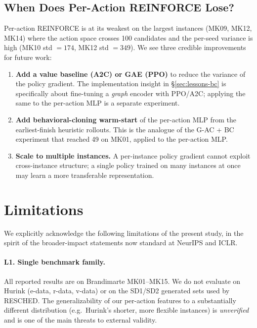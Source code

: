 \documentclass[10pt]{article}
\theoremstyle{definition}
\newcommand{\eg}{e.g.\!}
\begin{document}
\subsection{When Does Per-Action REINFORCE Lose?}

Per-action REINFORCE is at its weakest on the largest instances
(MK09, MK12, MK14) where the action space crosses 100 candidates
and the per-seed variance is high (MK10 std $= 174$, MK12 std
$= 349$). We see three credible improvements for future work:
\begin{enumerate}
  \item \textbf{Add a value baseline (A2C) or GAE (PPO)} to
        reduce the variance of the policy gradient. The
        implementation insight in \S\ref{sec:lessons-bc}
        is specifically about fine-tuning a \emph{graph}
        encoder with PPO/A2C; applying the same to the
        per-action MLP is a separate experiment.
  \item \textbf{Add behavioral-cloning warm-start} of the
        per-action MLP from the earliest-finish heuristic
        rollouts. This is the analogue of the G-AC + BC
        experiment that reached 49 on MK01, applied to the
        per-action MLP.
  \item \textbf{Scale to multiple instances.} A per-instance
        policy gradient cannot exploit cross-instance structure; a
        single policy trained on many instances at once may learn
        a more transferable representation.
\end{enumerate}

\section{Limitations}
\label{sec:limitations}

We explicitly acknowledge the following limitations of the
present study, in the spirit of the broader-impact statements
now standard at NeurIPS and ICLR.

\paragraph{L1. Single benchmark family.}
All reported results are on Brandimarte MK01--MK15. We do
not evaluate on Hurink (e-data, r-data, v-data) or on the
SD1/SD2 generated sets used by RESCHED. The generalizability
of our per-action features to a substantially different
distribution (\eg\ Hurink's shorter, more flexible
instances) is \emph{unverified} and is one of the main
threats to external validity.
\end{document}
